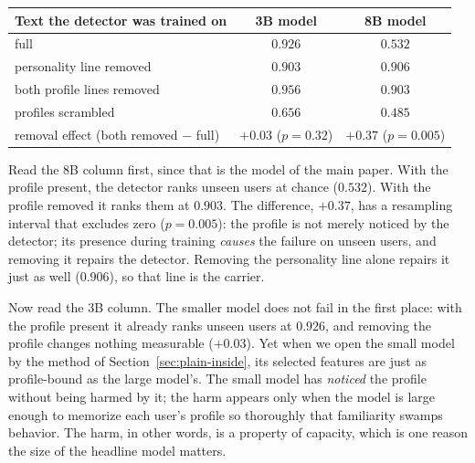 \documentclass[10pt]{article}
\begin{document}
\begin{center}
\begin{tabular}{lcc}
\toprule
Text the detector was trained on & 3B model & 8B model \\
\midrule
full                       & $0.926$ & $0.532$ \\
personality line removed   & $0.903$ & $\mathbf{0.906}$ \\
both profile lines removed & $0.956$ & $\mathbf{0.903}$ \\
profiles scrambled         & $0.656$ & $0.485$ \\
\midrule
removal effect (both removed $-$ full) & $+0.03$ ($p = 0.32$) & $\mathbf{+0.37}$ ($p = 0.005$) \\
\bottomrule
\end{tabular}
\end{center}

Read the 8B column first, since that is the model of the main paper. With
the profile present, the detector ranks unseen users at chance ($0.532$).
With the profile removed it ranks them at $0.903$. The difference,
$+0.37$, has a resampling interval that excludes zero ($p = 0.005$): the
profile is not merely noticed by the detector; its presence during
training \emph{causes} the failure on unseen users, and removing it
repairs the detector. Removing the personality line alone repairs it just
as well ($0.906$), so that line is the carrier.

Now read the 3B column. The smaller model does not fail in the first
place: with the profile present it already ranks unseen users at $0.926$,
and removing the profile changes nothing measurable ($+0.03$). Yet when we
open the small model by the method of Section~\ref{sec:plain-inside}, its
selected features are just as profile-bound as the large model's. The
small model has \emph{noticed} the profile without being harmed by it;
the harm appears only when the model is large enough to memorize each
user's profile so thoroughly that familiarity swamps behavior. The harm,
in other words, is a property of capacity, which is one reason the size
of the headline model matters.
\end{document}
